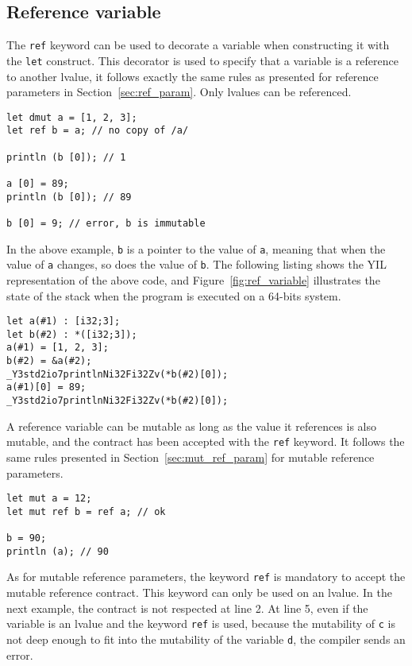 \subsection{Reference variable}

The \texttt{ref} keyword can be used to decorate a variable when constructing it
with the \texttt{let} construct. This decorator is used to specify that a
variable is a reference to another lvalue, it follows exactly the same rules as
presented for reference parameters in Section~\ref{sec:ref_param}. Only lvalues
can be referenced.

\begin{lstlisting}[style=coloredverbatim]
let dmut a = [1, 2, 3];
let ref b = a; // no copy of /a/

println (b [0]); // 1

a [0] = 89;
println (b [0]); // 89

b [0] = 9; // error, b is immutable
\end{lstlisting}

In the above example, \texttt{b} is a pointer to the value of \texttt{a},
meaning that when the value of \texttt{a} changes, so does the value of
\texttt{b}. The following listing shows the YIL representation of the above
code, and Figure~\ref{fig:ref_variable} illustrates the state of the stack when the
program is executed on a 64-bits system.

\begin{lstlisting}[style=intermediateVerb]
let a(#1) : [i32;3];
let b(#2) : *([i32;3]);
a(#1) = [1, 2, 3];
b(#2) = &a(#2);
_Y3std2io7printlnNi32Fi32Zv(*b(#2)[0]);
a(#1)[0] = 89;
_Y3std2io7printlnNi32Fi32Zv(*b(#2)[0]);
\end{lstlisting}



A reference variable can be mutable as long as the value it references is also
mutable, and the contract has been accepted with the \texttt{ref} keyword. It
follows the same rules presented in Section~\ref{sec:mut_ref_param} for mutable
reference parameters.

\begin{lstlisting}[style=coloredverbatim]
let mut a = 12;
let mut ref b = ref a; // ok

b = 90;
println (a); // 90
\end{lstlisting}

As for mutable reference parameters, the keyword \texttt{ref} is mandatory to
accept the mutable reference contract. This keyword can only be used on an
lvalue. In the next example, the contract is not respected at line 2. At line 5,
even if the variable is an lvalue and the keyword \texttt{ref} is used, because
the mutability of \texttt{c} is not deep enough to fit into the mutability of
the variable \texttt{d}, the compiler sends an error.

